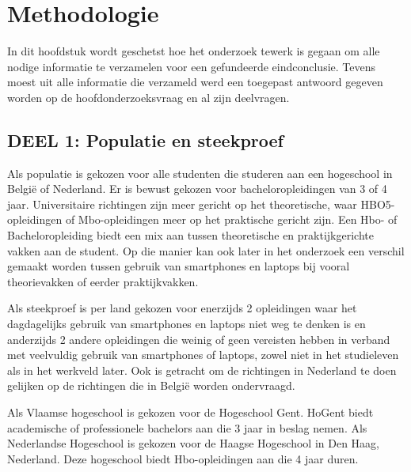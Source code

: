 
\chapter{Methodologie}
\label{ch:methodologie}

In dit hoofdstuk wordt geschetst hoe het onderzoek tewerk is gegaan om alle nodige informatie te verzamelen voor een gefundeerde eindconclusie. Tevens moest uit alle informatie die verzameld werd een toegepast antwoord gegeven worden op de hoofdonderzoeksvraag en al zijn deelvragen.

\section{DEEL 1: Populatie en steekproef}
\label{sec:popsteek}

Als populatie is gekozen voor alle studenten die studeren aan een hogeschool in België of Nederland. Er is bewust gekozen voor bacheloropleidingen van 3 of 4 jaar. Universitaire richtingen zijn meer gericht op het theoretische, waar HBO5-opleidingen of Mbo-opleidingen meer op het praktische gericht zijn. Een Hbo- of Bacheloropleiding biedt een mix aan tussen theoretische en praktijkgerichte vakken aan de student. Op die manier kan ook later in het onderzoek een verschil gemaakt worden tussen gebruik van smartphones en laptops bij vooral theorievakken of eerder praktijkvakken. 

Als steekproef is per land gekozen voor enerzijds 2 opleidingen waar het dagdagelijks gebruik van smartphones en laptops niet weg te denken is en anderzijds 2 andere opleidingen die weinig of geen vereisten hebben in verband met veelvuldig gebruik van smartphones of laptops, zowel niet in het studieleven als in het werkveld later. Ook is getracht om de richtingen in Nederland te doen gelijken op de richtingen die in België worden ondervraagd.

Als Vlaamse hogeschool is gekozen voor de Hogeschool Gent. HoGent biedt academische of professionele bachelors aan die 3 jaar in beslag nemen. Als Nederlandse Hogeschool is gekozen voor de Haagse Hogeschool in Den Haag, Nederland. Deze hogeschool biedt Hbo-opleidingen aan die 4 jaar duren.


